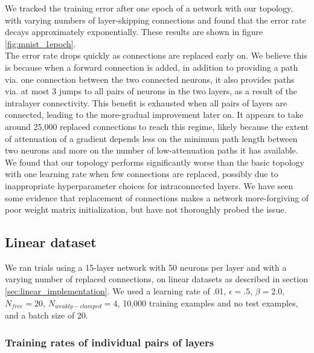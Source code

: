 \documentclass{article}
\newcommand{\npar}{\\\indent}
\begin{document}
We tracked the training error after one epoch of a network with our topology, with varying numbers of layer-skipping connections and found that the error rate decays approximately exponentially. These results are shown in figure \ref{fig:mnist_1epoch}.
\npar
The error rate drops quickly as connections are replaced early on. We believe this is because when a forward connection is added, in addition to providing a path via. one connection between the two connected neurons, it also provides paths via. at most 3 jumps to all pairs of neurons in the two layers, as a result of the intralayer connectivity. This benefit is exhausted when all pairs of layers are connected, leading to the more-gradual improvement later on. It appears to take around 25,000 replaced connections to reach this regime, likely because the extent of attenuation of a gradient depends less on the minimum path length between two neurons and more on the number of low-attenuation paths it has available.
\npar
We found that our topology performs significantly worse than the basic topology with one learning rate when few connections are replaced, possibly due to inappropriate hyperparameter choices for intraconnected layers. We have seen some evidence that replacement of connections makes a network more-forgiving of poor weight matrix initialization, but have not thoroughly probed the issue.

\subsection{Linear dataset}

We ran trials using a 15-layer network with 50 neurons per layer and with a varying number of replaced connections, on linear datasets as described in section \ref{sec:linear_implementation}. We used a learning rate of .01, $\epsilon=.5$, $\beta=2.0$, $N_{free}=20$, $N_{weakly-clamped}=4$, 10,000 training examples and no test examples, and a batch size of 20.

\subsubsection{Training rates of individual pairs of layers}
\end{document}

